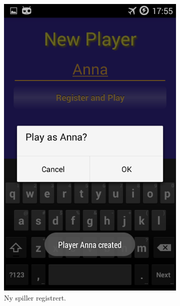 \begin{figure}[ht]
\begin{subfigure}[b]{0.3\textwidth}
        \includegraphics[width=\textwidth]{./img/bruksanvisning/3.png}
        \caption{Ny spiller registrert.}
        \label{fig:ny_spiller}
    \end{subfigure}
    \begin{subfigure}[b]{0.3\textwidth}

\end{subfigure}
\end{figure}

